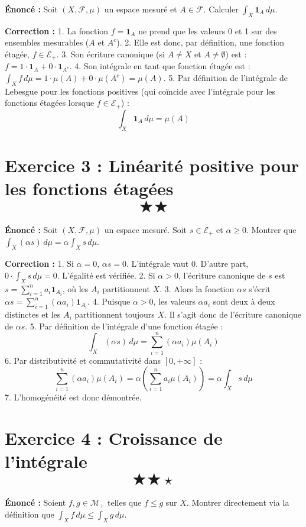\documentclass[11pt,a4paper]{article}
\begin{document}
\textbf{Énoncé :}
Soit $(X, \mathcal{F}, \mu)$ un espace mesuré et $A \in \mathcal{F}$.
Calculer $\int_X \mathbf{1}_A \, d\mu$.

\textbf{Correction :}
1. La fonction $f = \mathbf{1}_A$ ne prend que les valeurs 0 et 1 sur des ensembles mesurables ($A$ et $A^c$).
2. Elle est donc, par définition, une fonction étagée, $f \in \mathcal{E}_+$.
3. Son écriture canonique (si $A \neq X$ et $A \neq \emptyset$) est : $f = 1 \cdot \mathbf{1}_A + 0 \cdot \mathbf{1}_{A^c}$.
4. Son intégrale en tant que fonction étagée est : $\int_X f \, d\mu = 1 \cdot \mu(A) + 0 \cdot \mu(A^c) = \mu(A)$.
5. Par définition de l'intégrale de Lebesgue pour les fonctions positives (qui coïncide avec l'intégrale pour les fonctions étagées lorsque $f \in \mathcal{E}_+$) :
   $$\int_X \mathbf{1}_A \, d\mu = \mu(A)$$


\section{Exercice 3 : Linéarité positive pour les fonctions étagées \quad $$\bigstar\bigstar$$}

\textbf{Énoncé :}
Soit $(X, \mathcal{F}, \mu)$ un espace mesuré. Soit $s \in \mathcal{E}_+$ et $\alpha \ge 0$.
Montrer que $\int_X (\alpha s) \, d\mu = \alpha \int_X s \, d\mu$.

\textbf{Correction :}
1. Si $\alpha = 0$, $\alpha s = 0$. L'intégrale vaut 0. D'autre part, $0 \cdot \int_X s \, d\mu = 0$. L'égalité est vérifiée.
2. Si $\alpha > 0$, l'écriture canonique de $s$ est $s = \sum_{i=1}^n a_i \mathbf{1}_{A_i}$, où les $A_i$ partitionnent $X$.
3. Alors la fonction $\alpha s$ s'écrit $\alpha s = \sum_{i=1}^n (\alpha a_i) \mathbf{1}_{A_i}$.
4. Puisque $\alpha > 0$, les valeurs $\alpha a_i$ sont deux à deux distinctes et les $A_i$ partitionnent toujours $X$. Il s'agit donc de l'écriture canonique de $\alpha s$.
5. Par définition de l'intégrale d'une fonction étagée :
   $$\int_X (\alpha s) \, d\mu = \sum_{i=1}^n (\alpha a_i) \mu(A_i)$$
6. Par distributivité et commutativité dans $[0, +\infty]$ :
   $$\sum_{i=1}^n (\alpha a_i) \mu(A_i) = \alpha \left( \sum_{i=1}^n a_i \mu(A_i) \right) = \alpha \int_X s \, d\mu$$
7. L'homogénéité est donc démontrée.


\section{Exercice 4 : Croissance de l'intégrale \quad $$\bigstar\bigstar\star$$}

\textbf{Énoncé :}
Soient $f, g \in \mathcal{M}_+$ telles que $f \le g$ sur $X$.
Montrer directement via la définition que $\int_X f \, d\mu \le \int_X g \, d\mu$.
\end{document}
